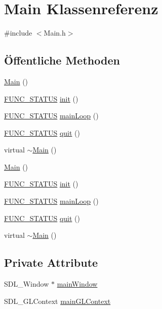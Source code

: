 \hypertarget{classMain}{\section{Main Klassenreferenz}
\label{classMain}
}


{\ttfamily \#include $<$Main.\-h$>$}

\subsection*{Öffentliche Methoden}
\begin{DoxyCompactItemize}
\item 
\hyperlink{classMain_a50d4361a1b613205467a441b5c40c199}{Main} ()
\item 
\hyperlink{CLGL__test_2constants_8h_a39afd8674e0207ea1022d668757b01dc}{F\-U\-N\-C\-\_\-\-S\-T\-A\-T\-U\-S} \hyperlink{classMain_ad596be0813b2b7316edf614debd21d2d}{init} ()
\item 
\hyperlink{CLGL__test_2constants_8h_a39afd8674e0207ea1022d668757b01dc}{F\-U\-N\-C\-\_\-\-S\-T\-A\-T\-U\-S} \hyperlink{classMain_a2c54a5b5efdb5e02be834319c494620c}{main\-Loop} ()
\item 
\hyperlink{CLGL__test_2constants_8h_a39afd8674e0207ea1022d668757b01dc}{F\-U\-N\-C\-\_\-\-S\-T\-A\-T\-U\-S} \hyperlink{classMain_a802cbb1fe1633d0711854588731df519}{quit} ()
\item 
virtual \hyperlink{classMain_a58d9c0798f0d2114e736d04d780a080f}{$\sim$\-Main} ()
\item 
\hyperlink{classMain_a50d4361a1b613205467a441b5c40c199}{Main} ()
\item 
\hyperlink{CLGL__test_2constants_8h_a39afd8674e0207ea1022d668757b01dc}{F\-U\-N\-C\-\_\-\-S\-T\-A\-T\-U\-S} \hyperlink{classMain_ad596be0813b2b7316edf614debd21d2d}{init} ()
\item 
\hyperlink{CLGL__test_2constants_8h_a39afd8674e0207ea1022d668757b01dc}{F\-U\-N\-C\-\_\-\-S\-T\-A\-T\-U\-S} \hyperlink{classMain_a2c54a5b5efdb5e02be834319c494620c}{main\-Loop} ()
\item 
\hyperlink{CLGL__test_2constants_8h_a39afd8674e0207ea1022d668757b01dc}{F\-U\-N\-C\-\_\-\-S\-T\-A\-T\-U\-S} \hyperlink{classMain_a802cbb1fe1633d0711854588731df519}{quit} ()
\item 
virtual \hyperlink{classMain_a6509d28ba0e266073dfec1b56fe6563d}{$\sim$\-Main} ()
\end{DoxyCompactItemize}
\subsection*{Private Attribute}
\begin{DoxyCompactItemize}
\item 
S\-D\-L\-\_\-\-Window $\ast$ \hyperlink{classMain_aa76a383cb4c4a9da5e4522dc3983fa6b}{main\-Window}
\item 
S\-D\-L\-\_\-\-G\-L\-Context \hyperlink{classMain_a984d2733994032c9087b63e328764672}{main\-G\-L\-Context}
\end{DoxyCompactItemize}


